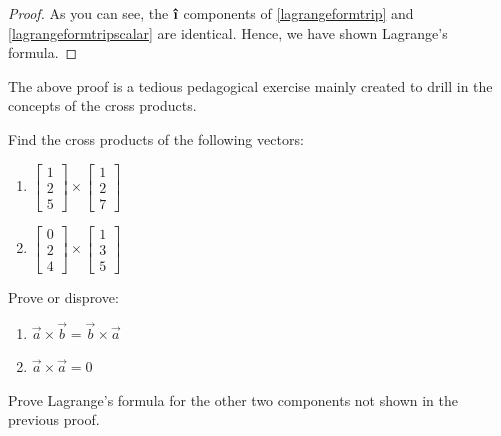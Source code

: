 \begin{proof}
  As you can see, the \(\ihat\) components of \ref{lagrangeformtrip} and \ref{lagrangeformtripscalar} are identical. Hence, we have shown Lagrange's formula.
\end{proof}
\begin{remark}
  The above proof is a tedious pedagogical exercise mainly created to drill in the concepts of the cross products.
\end{remark}
\begin{problem}
  Find the cross products of the following vectors:
  \begin{enumerate}[label=\alph*)]
    \item{\(\begin{bmatrix}
        1 \\
        2 \\
        5
    \end{bmatrix} \times \begin{bmatrix}
      1 \\ 
      2 \\ 
      7
    \end{bmatrix} \)}
  \item{\(\begin{bmatrix}
      0 \\
      2 \\
      4 
  \end{bmatrix} \times \begin{bmatrix}
    1 \\
    3 \\ 
    5
  \end{bmatrix} \)}
  \end{enumerate}

\end{problem}  
\begin{problem}[1]
  Prove or disprove: 
  \begin{enumerate}[label=\alph*)]
    \item{\(\vec{a}\times\vec{b}=\vec{b}\times\vec{a}\)}
    \item{\(\vec{a}\times\vec{a}=0\)}
  \end{enumerate}

\end{problem}
\begin{problem}[1]
  Prove Lagrange's formula for the other two components not shown in the previous proof.
\end{problem}

